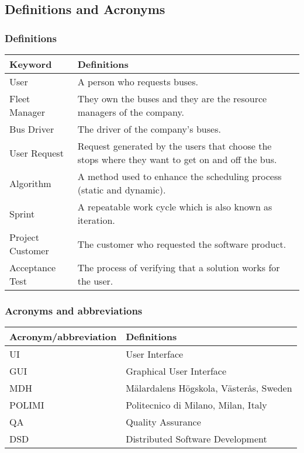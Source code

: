\subsection{Definitions and Acronyms}

\subsubsection{Definitions}
\begin{center}
	\begin{tabular} { | m{3.5cm} | m{9.5cm} | }
		\hline
		\textbf{Keyword} & \textbf{Definitions}\\
		\hline
		User & A person who requests buses.\\
		\hline
		Fleet Manager & They own the buses and they are the resource managers of the company.\\
		\hline
		Bus Driver & The driver of the company's buses.\\
		\hline
		User Request & Request generated by the users that choose the stops where they want to get on and off the bus.\\
		\hline
		Algorithm & A method used to enhance the scheduling process (static and dynamic).\\
		\hline
		Sprint & A repeatable work cycle which is also known as iteration.\\
		\hline
		Project Customer & The customer who requested the software product.\\
		\hline
		Acceptance Test & The process of verifying that a solution works for the user.\\
		\hline
	\end{tabular}
\end{center}
\subsubsection{Acronyms and abbreviations}
\begin{center}
	\begin{tabular} { | m{5cm} | m{8cm} | }
		\hline
		\textbf{Acronym/abbreviation} & \textbf{Definitions}\\
		\hline
		UI & User Interface\\
		\hline
		GUI & Graphical User Interface\\
		\hline
		MDH & M\"{a}lardalens H\"{o}gskola, V\"{a}ster\r{a}s, Sweden\\
		\hline
		POLIMI & Politecnico di Milano, Milan, Italy\\
		\hline
		QA & Quality Assurance\\
		\hline
		DSD & Distributed Software Development\\
		\hline
	\end{tabular}
\end{center}